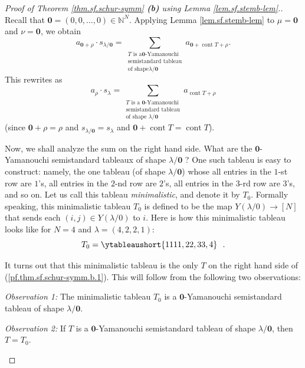 \begin{proof}
[Proof of Theorem \ref{thm.sf.schur-symm} \textbf{(b)} using Lemma
\ref{lem.sf.stemb-lem}.]Recall that $\mathbf{0}=\left(  0,0,\ldots,0\right)
\in\mathbb{N}^{N}$. Applying Lemma \ref{lem.sf.stemb-lem} to $\mu=\mathbf{0}$
and $\nu=\mathbf{0}$, we obtain%
\[
a_{\mathbf{0}+\rho}\cdot s_{\lambda/\mathbf{0}}=\sum_{\substack{T\text{ is a
}\mathbf{0}\text{-Yamanouchi}\\\text{semistandard tableau}\\\text{of shape
}\lambda/\mathbf{0}}}a_{\mathbf{0}+\operatorname*{cont}T+\rho}.
\]
This rewrites as%
\begin{equation}
a_{\rho}\cdot s_{\lambda}=\sum_{\substack{T\text{ is a }\mathbf{0}%
\text{-Yamanouchi}\\\text{semistandard tableau}\\\text{of shape }%
\lambda/\mathbf{0}}}a_{\operatorname*{cont}T+\rho}
\label{pf.thm.sf.schur-symm.b.1}%
\end{equation}
(since $\mathbf{0}+\rho=\rho$ and $s_{\lambda/\mathbf{0}}=s_{\lambda}$ and
$\mathbf{0}+\operatorname*{cont}T=\operatorname*{cont}T$).

Now, we shall analyze the sum on the right hand side. What are the
$\mathbf{0}$-Yamanouchi semistandard tableaux of shape $\lambda/\mathbf{0}$ ?
One such tableau is easy to construct: namely, the one tableau (of shape
$\lambda/\mathbf{0}$) whose all entries in the $1$-st row are $1$'s, all
entries in the $2$-nd row are $2$'s, all entries in the $3$-rd row are $3$'s,
and so on. Let us call this tableau \emph{minimalistic}, and denote it by
$T_{0}$. Formally speaking, this minimalistic tableau $T_{0}$ is defined to be
the map $Y\left(  \lambda/0\right)  \rightarrow\left[  N\right]  $ that sends
each $\left(  i,j\right)  \in Y\left(  \lambda/0\right)  $ to $i$. Here is how
this minimalistic tableau looks like for $N=4$ and $\lambda=\left(
4,2,2,1\right)  $:%
\[
T_{0}=\ytableaushort{1111,22,33,4}\ \ .
\]


It turns out that this minimalistic tableau is the only $T$ on the right hand
side of (\ref{pf.thm.sf.schur-symm.b.1}). This will follow from the following
two observations:

\begin{statement}
\textit{Observation 1:} The minimalistic tableau $T_{0}$ is a $\mathbf{0}%
$-Yamanouchi semistandard tableau of shape $\lambda/\mathbf{0}$.
\end{statement}

\begin{statement}
\textit{Observation 2:} If $T$ is a $\mathbf{0}$-Yamanouchi semistandard
tableau of shape $\lambda/\mathbf{0}$, then $T=T_{0}$.
\end{statement}


\end{proof}
